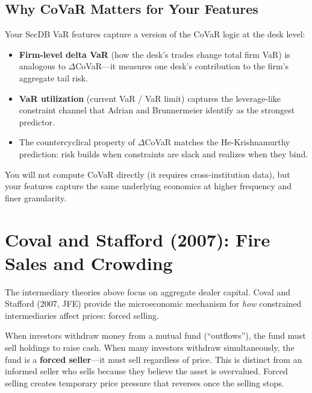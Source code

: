 \subsection{Why CoVaR Matters for Your Features}

\begin{projectconnection}
Your SecDB VaR features capture a version of the CoVaR logic at the desk level:
\begin{itemize}[nosep]
  \item \textbf{Firm-level delta VaR} (how the desk's trades change total firm VaR) is analogous to $\Delta$CoVaR---it measures one desk's contribution to the firm's aggregate tail risk.
  \item \textbf{VaR utilization} (current VaR / VaR limit) captures the leverage-like constraint channel that Adrian and Brunnermeier identify as the strongest predictor.
  \item The countercyclical property of $\Delta$CoVaR matches the He-Krishnamurthy prediction: risk builds when constraints are slack and realizes when they bind.
\end{itemize}
You will not compute CoVaR directly (it requires cross-institution data), but your features capture the same underlying economics at higher frequency and finer granularity.
\end{projectconnection}

\section{Coval and Stafford (2007): Fire Sales and Crowding}
\label{sec:coval-stafford}

The intermediary theories above focus on aggregate dealer capital. Coval and Stafford (2007, JFE) provide the microeconomic mechanism for \emph{how} constrained intermediaries affect prices: forced selling.

\begin{prereq}
When investors withdraw money from a mutual fund (``outflows''), the fund must sell holdings to raise cash. When many investors withdraw simultaneously, the fund is a \textbf{forced seller}---it must sell regardless of price. This is distinct from an informed seller who sells because they believe the asset is overvalued. Forced selling creates temporary price pressure that reverses once the selling stops.
\end{prereq}

